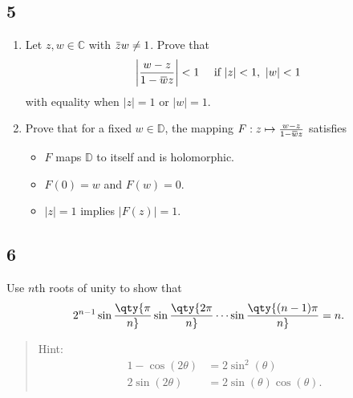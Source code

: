 \hypertarget{section-30}{%
\subsection{5}\label{section-30}}

\begin{enumerate}
\def\labelenumi{\alph{enumi}.}
\item
  Let \(z, w \in {\mathbb{C}}\) with
  \(\mkern 1.5mu\overline{\mkern-1.5muz\mkern-1.5mu}\mkern 1.5mu w \neq 1\).
  Prove that
  \begin{align*}
   {\left\lvert {w-z \over 1 - \mkern 1.5mu\overline{\mkern-1.5muw\mkern-1.5mu}\mkern 1.5mu z} \right\rvert} < 1 \quad\text{ if } {\left\lvert {z} \right\rvert}<1,~ {\left\lvert {w} \right\rvert} < 1
   \end{align*}
  with equality when \({\left\lvert {z} \right\rvert} = 1\) or
  \({\left\lvert {w} \right\rvert} = 1\).
\item
  Prove that for a fixed \(w\in {\mathbb{D}}\), the mapping
  \(F: z\mapsto {w-z \over 1 - \mkern 1.5mu\overline{\mkern-1.5muw\mkern-1.5mu}\mkern 1.5mu z}\)
  satisfies

  \begin{itemize}
  \tightlist
  \item
    \(F\) maps \({\mathbb{D}}\) to itself and is holomorphic.
  \item
    \(F(0) = w\) and \(F(w) = 0\).
  \item
    \({\left\lvert {z} \right\rvert} = 1\) implies
    \({\left\lvert {F(z)} \right\rvert} = 1\).
  \end{itemize}
\end{enumerate}

\hypertarget{section-31}{%
\subsection{6}\label{section-31}}

Use \(n\)th roots of unity to show that
\begin{align*}
2^{n-1} \sin\qty{\pi \over n} \sin\qty{2\pi \over n} \cdots \sin\qty{(n-1)\pi \over n} = n
.\end{align*}

\begin{quote}
Hint:
\begin{align*}
1 - \cos(2\theta) &= 2\sin^2(\theta) \\
2 \sin(2\theta) &= 2\sin(\theta) \cos(\theta)
.\end{align*}
\end{quote}

